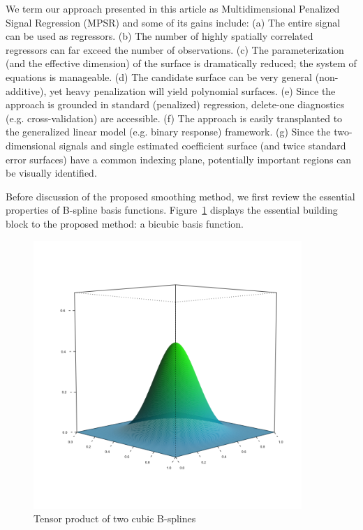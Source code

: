 \documentclass[12pt]{article}
\begin{document}
{We term our approach presented in this article as Multidimensional Penalized Signal Regression (MPSR) and some of its gains include: (a) The entire signal can be used as regressors. (b) The number of highly spatially correlated regressors can far exceed the number of observations. (c) The parameterization (and the effective dimension) of the surface is dramatically reduced; the system of equations is manageable. (d) The candidate surface can be very general (non-additive), yet heavy penalization will yield polynomial surfaces. (e) Since the approach is grounded in standard (penalized) regression, delete-one diagnostics (e.g. cross-validation) are accessible. (f) The approach is easily transplanted to the generalized linear model (e.g. binary response) framework. (g) Since the two-dimensional signals and single estimated coefficient surface (and twice standard error surfaces) have a common indexing plane, potentially important regions can be visually identified.}

Before discussion of the proposed smoothing method, we first review the essential properties of B-spline basis functions. Figure~\ref{fig:bicubic_bspline} displays the essential building block to the proposed method: a bicubic basis function. 
\begin{figure}[H]
  \centering
 \graphicspath{{img/}}
  \includegraphics[width=4in, height=4in]{bicubic_bspline.png}
  \caption{Tensor product of two cubic B-splines}\label{fig:bicubic_bspline}
\end{figure}
\end{document}
